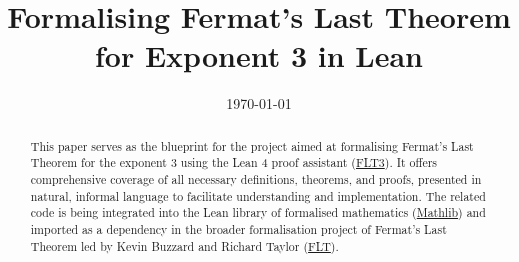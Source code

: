 \documentclass[11pt,a4paper]{report}
\title{\textbf{Formalising Fermat's Last Theorem for Exponent 3 in Lean}}
\date{\today}
\begin{document}
\maketitle

\begin{abstract}
    This paper serves as the blueprint for the project aimed at formalising Fermat’s Last Theorem
    for the exponent 3 using the Lean 4 proof assistant (\href{https://github.com/pitmonticone/FLT3}{FLT3}).
    It offers comprehensive coverage of all necessary definitions, theorems, and proofs, presented in natural,
    informal language to facilitate understanding and implementation. The related code is being integrated
    into the Lean library of formalised mathematics (\href{https://github.com/leanprover-community/mathlib4}{Mathlib})
    and imported as a dependency in the broader formalisation project of Fermat's Last Theorem led by
    Kevin Buzzard and Richard Taylor (\href{https://github.com/ImperialCollegeLondon/FLT}{FLT}).
\end{abstract}

\tableofcontents



\nocite{*}
\printbibliography[title=References]
\end{document}
